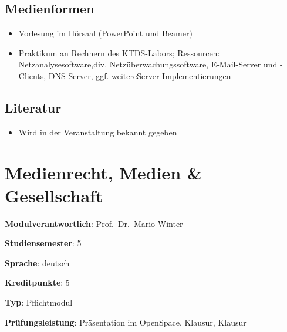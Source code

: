\hypertarget{medienformenpathlabelmi-2017modulbeschreibungen-bachelorba_kommunikationstechnikundnetze}{%
\section*{Medienformen\label{/mi-2017/modulbeschreibungen-bachelor/BA_KommunikationstechnikundNetze}}\label{medienformenpathlabelmi-2017modulbeschreibungen-bachelorba_kommunikationstechnikundnetze}}

\begin{itemize}
\tightlist
\item
  Vorlesung im Hörsaal (PowerPoint und Beamer)
\item
  Praktikum an Rechnern des KTDS-Labors; Ressourcen:
  Netzanalysesoftware,div. Netzüberwachungssoftware, E-Mail-Server und
  -Clients, DNS-Server, ggf. weitereServer-Implementierungen
\end{itemize}

\hypertarget{literaturpathlabelmi-2017modulbeschreibungen-bachelorba_kommunikationstechnikundnetze}{%
\section*{Literatur\label{/mi-2017/modulbeschreibungen-bachelor/BA_KommunikationstechnikundNetze}}\label{literaturpathlabelmi-2017modulbeschreibungen-bachelorba_kommunikationstechnikundnetze}}

\begin{itemize}
\tightlist
\item
  Wird in der Veranstaltung bekannt gegeben
\end{itemize}

\hypertarget{medienrecht-medien-gesellschaftpathlabelmi-2017modulbeschreibungen-bachelorba_mug}{%
\chapter{Medienrecht, Medien \&
Gesellschaft\label{/mi-2017/modulbeschreibungen-bachelor/BA_MUG}}\label{medienrecht-medien-gesellschaftpathlabelmi-2017modulbeschreibungen-bachelorba_mug}}

\begin{modulHead}
\textbf{Modulverantwortlich}: Prof.~Dr.~Mario
Winter
\end{modulHead}
\begin{modulHead}
\textbf{Studiensemester}:
5
\end{modulHead}
\begin{modulHead}
\textbf{Sprache}:
deutsch
\end{modulHead}
\begin{modulHead}
\textbf{Kreditpunkte}:
5
\end{modulHead}
\begin{modulHead}
\textbf{Typ}:
Pflichtmodul
\end{modulHead}
\begin{modulHead}
\textbf{Prüfungsleistung}:
Präsentation im OpenSpace, Klausur, Klausur
\end{modulHead}


